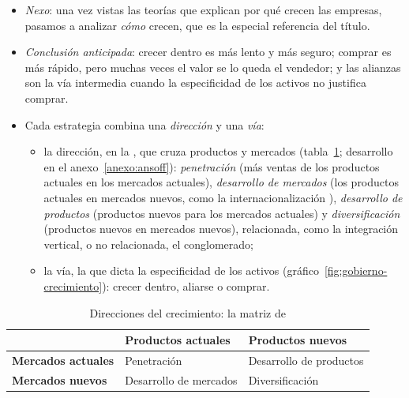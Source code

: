 \documentclass[11pt]{article}
\begin{document}
\begin{itemize}
\item \emph{Nexo}: una vez vistas las teorías que explican por qué crecen las empresas, pasamos a analizar \emph{cómo} crecen, que es la especial referencia del título.
\item \emph{Conclusión anticipada}: crecer dentro es más lento y más seguro; comprar es más rápido, pero muchas veces el valor se lo queda el vendedor; y las alianzas son la vía intermedia cuando la especificidad de los activos no justifica comprar.
\item Cada estrategia combina una \emph{dirección} y una \emph{vía}:
  \begin{itemize}
  \item la dirección, en la \nocite{Ansoff1957Strategies}, que cruza productos y mercados (tabla~\ref{tab:ansoff}; desarrollo en el anexo~\ref{anexo:ansoff}): \emph{penetración} (más ventas de los productos actuales en los mercados actuales), \emph{desarrollo de mercados} (los productos actuales en mercados nuevos, como la internacionalización ), \emph{desarrollo de productos} (productos nuevos para los mercados actuales) y \emph{diversificación} (productos nuevos en mercados nuevos), relacionada, como la integración vertical, o no relacionada, el conglomerado;
  \item la vía, la que dicta la especificidad de los activos (gráfico~\ref{fig:gobierno-crecimiento}): crecer dentro, aliarse o comprar.
  \end{itemize}
\end{itemize}

\begin{table}[H]
\centering
\caption{Direcciones del crecimiento: la matriz de }\label{tab:ansoff}
\begin{tabular}{>{\centering\arraybackslash}m{3.2cm}>{\centering\arraybackslash}m{4.2cm}>{\centering\arraybackslash}m{4.2cm}}
\toprule
\rowcolor{tceeazulpalido} & \textbf{Productos actuales} & \textbf{Productos nuevos} \\
\midrule
\textbf{Mercados actuales} & \cellcolor{tceesalvia}\textcolor{tceeverde}{Penetración} & \textcolor{tceeazul}{Desarrollo de productos} \\
\textbf{Mercados nuevos} & \textcolor{tceeazul}{Desarrollo de mercados} & \cellcolor{tceesalmon}\textcolor{tceerojo}{Diversificación} \\
\bottomrule
\end{tabular}
\end{table}
\end{document}
